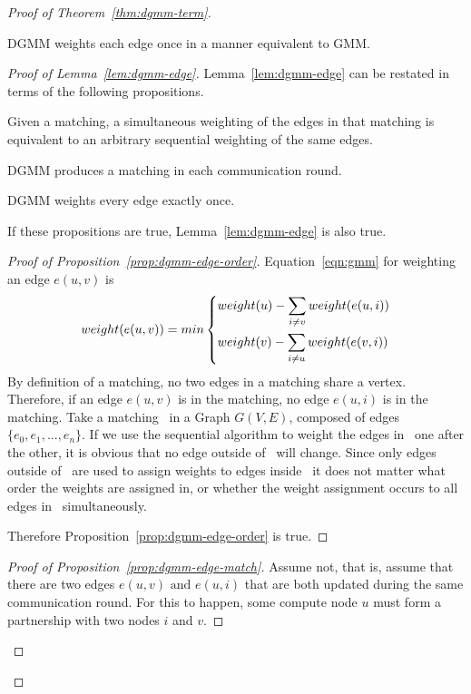 \begin{proof}[Proof of Theorem~\ref{thm:dgmm-term}]
\label{prf:correct}

\begin{lem}
\label{lem:dgmm-edge}
  DGMM weights each edge once in a manner equivalent to GMM.
\end{lem}
\begin{proof}[Proof of Lemma~\ref{lem:dgmm-edge}]
  Lemma~\ref{lem:dgmm-edge} can be restated in terms of the following propositions.
  \begin{lprp}
    \label{prop:dgmm-edge-order}
    Given a matching, a simultaneous weighting of the edges in that matching is equivalent to an arbitrary sequential weighting of the same edges.
  \end{lprp}
  \begin{lprp}
    \label{prop:dgmm-edge-match}
    DGMM produces a matching in each communication round.
  \end{lprp}
  \begin{lprp}
    \label{prop:dgmm-edge-once}
    DGMM weights every edge exactly once.
  \end{lprp}
  If these propositions are true, Lemma~\ref{lem:dgmm-edge} is also true. 
  
  \begin{proof}[Proof of Proposition~\ref{prop:dgmm-edge-order}]
    Equation~\ref{eqn:gmm} for weighting an edge $e(u,v)$ is 
    \begin{equation*}
      weight(e(u,v)) = min
      \begin{dcases}
        weight(u) - \sum_{i \ne v} weight(e(u,i))\\
        weight(v) - \sum_{i \ne u} weight(e(v,i))
      \end{dcases}
    \end{equation*}
    By definition of a matching, no two edges in a matching share a vertex. Therefore, if an edge $e(u,v)$ is in the matching, no edge $e(u,i)$ is in the matching. 
    Take a matching \bMd\ in a Graph $G(V,E)$, composed of edges $\{e_0, e_1, ..., e_n\}$. If we use the sequential algorithm to weight the edges in \bMd\ one after the other, it is obvious that no edge outside of \bMd\ will change. Since only edges outside of \bMd\ are used to assign weights to edges inside \bMd\, it does not matter what order the weights are assigned in, or whether the weight assignment occurs to all edges in \bMd\ simultaneously.
    
    Therefore Proposition~\ref{prop:dgmm-edge-order} is true.
  \end{proof}
  \begin{proof}[Proof of Proposition~\ref{prop:dgmm-edge-match}]
    Assume not, that is, assume that there are two edges $e(u,v) \text{ and } e(u,i)$ that are both updated during the same communication round. For this to happen, some compute node $u$ must form a partnership with two nodes $i$ and $v$. 
    

\end{proof}
\end{proof}
\end{proof}
